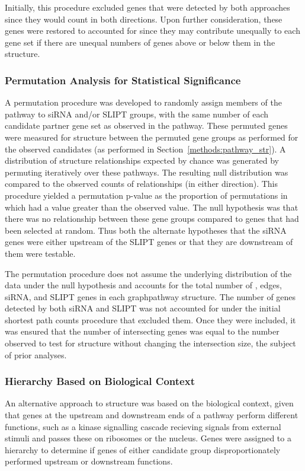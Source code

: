 Initially, this procedure excluded genes that were detected by both approaches since they would count in both directions. Upon further consideration, these genes were restored to accounted for since they may contribute unequally to each gene set if there are unequal numbers of genes above or below them in the  structure.

\subsubsection{Permutation Analysis for Statistical Significance} \label{methods:network_permutation}
A permutation procedure was developed to randomly assign members of the pathway to \gls{siRNA} and/or \gls{SLIPT} groups, with the same number of each candidate partner gene set as observed in the pathway. These permuted genes were measured for  structure between the permuted gene groups as performed for the observed candidates (as performed in Section~\ref{methods:pathway_str}). A distribution of  structure relationships expected by chance was generated by permuting iteratively over these pathways. The resulting null distribution was compared to the observed counts of relationships (in either direction). This procedure yielded a permutation p-value as the proportion of permutations in which had a value greater than the observed value. The null hypothesis was that there was no relationship between these gene groups compared to genes that had been selected at random. Thus both the alternate hypotheses that the \gls{siRNA} genes were either upstream of the \gls{SLIPT} genes or that they are downstream of them were testable.

The permutation procedure does not assume the underlying distribution of the data under the null hypothesis and accounts for the total number of , \glspl{edge}, \gls{siRNA}, and \gls{SLIPT} genes in each \gls{graph}{pathway} structure. The number of genes detected by both \gls{siRNA} and \gls{SLIPT} was not accounted for under the initial \gls{shortest path} counts procedure that excluded them. Once they were included, it was ensured that the number of intersecting genes was equal to the number observed to test for  structure without changing the intersection size, the subject of prior analyses.

\subsubsection{Hierarchy Based on Biological Context} \label{methods:pathway_rank}
An alternative approach to  structure was based on the biological context, given that genes at the upstream and downstream ends of a pathway perform different functions, such as a kinase signalling cascade recieving signals from external stimuli and passes these on ribosomes or the nucleus. Genes were assigned to a hierarchy to determine if genes of either candidate group disproportionately performed upstream or downstream functions.

